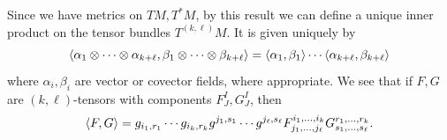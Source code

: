 Since we have metrics on $TM,T^*M$, by this result we can define a unique inner product on the tensor bundles $T^{(k,\ell)}M$.
It is given uniquely by
$$ \mathopen{}\mathclose{\left<\alpha_1\otimes\cdots\otimes\alpha_{k+\ell},\beta_1\otimes\cdots\otimes\beta_{k+\ell}\right>} = \mathopen{}\mathclose{\left<\alpha_1,\beta_1\right>}\cdots\mathopen{}\mathclose{\left<\alpha_{k+\ell},\beta_{k+\ell}\right>} $$
where $\alpha_i,\beta_i$ are vector or covector fields, where appropriate.
We see that if $F,G$ are $(k,\ell)$-tensors with components $F^I_J,G^I_J$, then
$$ \mathopen{}\mathclose{\left<F,G\right>} = g_{i_1,r_1}\cdots g_{i_k,r_k}g^{j_1,s_1}\cdots g^{j_\ell,s_\ell}F^{i_1,\dots,i_k}_{j_1,\dots,j_\ell}G^{r_1,\dots,r_k}_{s_1,\dots,s_\ell} . $$

